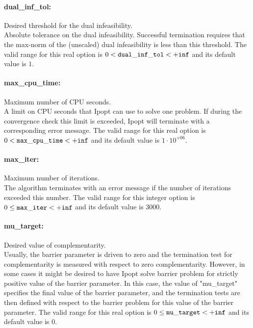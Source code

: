 \paragraph{dual\_inf\_tol:}\label{opt:dual_inf_tol} Desired threshold for the dual infeasibility. \\
 Absolute tolerance on the dual infeasibility. Successful termination requires that the max-norm of the (unscaled) dual infeasibility is less than this threshold. The valid range for this real option is 
$0 <  {\tt dual\_inf\_tol } <  {\tt +inf}$
and its default value is $1$.


\paragraph{max\_cpu\_time:}\label{opt:max_cpu_time} Maximum number of CPU seconds. \\
 A limit on CPU seconds that Ipopt can use to solve one problem.  If during the convergence check this limit is exceeded, Ipopt will terminate with a corresponding error message. The valid range for this real option is 
$0 <  {\tt max\_cpu\_time } <  {\tt +inf}$
and its default value is $1 \cdot 10^{+06}$.


\paragraph{max\_iter:}\label{opt:max_iter} Maximum number of iterations. \\
 The algorithm terminates with an error message if the number of iterations exceeded this number. The valid range for this integer option is
$0 \le {\tt max\_iter } <  {\tt +inf}$
and its default value is $3000$.


\paragraph{mu\_target:}\label{opt:mu_target} Desired value of complementarity. \\
 Usually, the barrier parameter is driven to zero and the termination test for complementarity is measured with respect to zero complementarity.  However, in some cases it might be desired to have Ipopt solve barrier problem for strictly positive value of the barrier parameter.  In this case, the value of "mu\_target" specifies the final value of the barrier parameter, and the termination tests are then defined with respect to the barrier problem for this value of the barrier parameter. The valid range for this real option is 
$0 \le {\tt mu\_target } <  {\tt +inf}$
and its default value is $0$.


